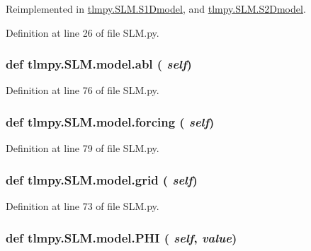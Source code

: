 Reimplemented in \hyperlink{classtlmpy_1_1SLM_1_1S1Dmodel_ae74afc88fbe7090f8c6aadc5d2330687}{tlmpy.SLM.S1Dmodel}, and \hyperlink{classtlmpy_1_1SLM_1_1S2Dmodel_a56982f807e406ff4aede8d4ac476b63a}{tlmpy.SLM.S2Dmodel}.

Definition at line 26 of file SLM.py.\hypertarget{classtlmpy_1_1SLM_1_1model_a0a01e5ea92a0d9375b25a62bfce94d70}{
\subsubsection[{abl}]{\setlength{\rightskip}{0pt plus 5cm}def tlmpy.SLM.model.abl ( {\em self})}}
\label{classtlmpy_1_1SLM_1_1model_a0a01e5ea92a0d9375b25a62bfce94d70}


Definition at line 76 of file SLM.py.\hypertarget{classtlmpy_1_1SLM_1_1model_a68a422062d9c2f640bf5d46135990d11}{
\subsubsection[{forcing}]{\setlength{\rightskip}{0pt plus 5cm}def tlmpy.SLM.model.forcing ( {\em self})}}
\label{classtlmpy_1_1SLM_1_1model_a68a422062d9c2f640bf5d46135990d11}


Definition at line 79 of file SLM.py.\hypertarget{classtlmpy_1_1SLM_1_1model_aac82ecc27ac4fa11232563e965e84750}{
\subsubsection[{grid}]{\setlength{\rightskip}{0pt plus 5cm}def tlmpy.SLM.model.grid ( {\em self})}}
\label{classtlmpy_1_1SLM_1_1model_aac82ecc27ac4fa11232563e965e84750}


Definition at line 73 of file SLM.py.\hypertarget{classtlmpy_1_1SLM_1_1model_ab5b55ee660a1e2c24e2c6cd0f5626ab5}{
\subsubsection[{PHI}]{\setlength{\rightskip}{0pt plus 5cm}def tlmpy.SLM.model.PHI ( {\em self}, \/   {\em value})}}
\label{classtlmpy_1_1SLM_1_1model_ab5b55ee660a1e2c24e2c6cd0f5626ab5}


